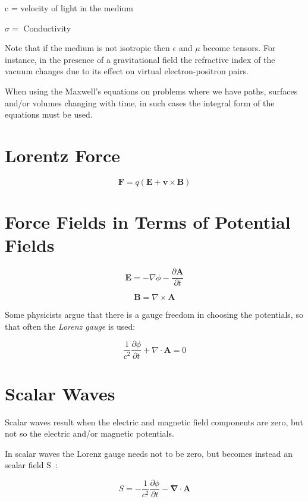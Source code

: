 \documentclass[english]{book}
\begin{document}
c = velocity of light in the medium

$\sigma =$ Conductivity

Note that if the medium is not isotropic then $\epsilon$ and $\mu$ become tensors. For instance, in the presence of a gravitational field the refractive index of the vacuum changes due to its effect on virtual electron-positron pairs.

When using the Maxwell's equations on problems where we have paths, surfaces and/or volumes changing with time, in such cases the integral form of the equations must be used.


\section{Lorentz Force}

\[
\mathbf{F}=q\left(\mathbf{E}+\mathbf{v}\times\mathbf{B}\right)
\]


\section{Force Fields in Terms of Potential Fields}

\begin{equation}
\mathbf{E}=-\nabla\phi - \frac{\partial\mathbf{A}}{\partial t}              \label{eq:Epot}
\end{equation}

\begin{equation}
\mathbf{B}=\nabla\times\mathbf{A}          \label{eq:Bpot}
\end{equation}

Some physicists argue that there is a gauge freedom in choosing the potentials, so that often the \emph{Lorenz gauge} is used:

\[
\frac{1}{c^2} \frac{\partial \phi}{\partial t} + \nabla \cdot \mathbf{A} = 0
\]

\section{Scalar Waves}

Scalar waves result when the electric and magnetic field components are zero, but not so the electric and/or magnetic potentials.

In scalar waves the Lorenz gauge needs not to be zero, but becomes instead an scalar field S~\cite{Vlaen}:

\begin{equation}
S = -\frac{1}{c^{2}}\frac{\partial\phi}{\partial t} - \mathbf{\nabla} \cdot \mathbf{A}      \label{eq:Spot}
\end{equation}
\end{document}
